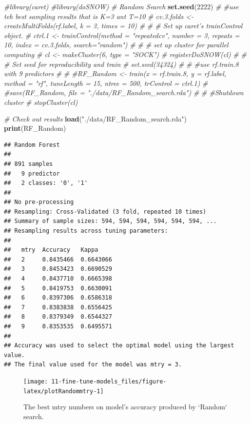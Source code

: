 \documentclass[
]{book}
\newenvironment{Shaded}{\begin{snugshade}}{\end{snugshade}}
\newcommand{\CommentTok}[1]{\textcolor[rgb]{0.56,0.35,0.01}{\textit{#1}}}
\newcommand{\DecValTok}[1]{\textcolor[rgb]{0.00,0.00,0.81}{#1}}
\newcommand{\KeywordTok}[1]{\textcolor[rgb]{0.13,0.29,0.53}{\textbf{#1}}}
\newcommand{\NormalTok}[1]{#1}
\newcommand{\StringTok}[1]{\textcolor[rgb]{0.31,0.60,0.02}{#1}}
\begin{document}
\begin{Shaded}
\begin{Highlighting}[]
\CommentTok{#library(caret)}
\CommentTok{#library(doSNOW)}
\CommentTok{# Random Search}
\KeywordTok{set.seed}\NormalTok{(}\DecValTok{2222}\NormalTok{)}
\CommentTok{# #use teh best sampling results that is K=3 ant T=10}
\CommentTok{# cv.3.folds <- createMultiFolds(rf.label, k = 3, times = 10)}
\CommentTok{# }
\CommentTok{# # Set up caret's trainControl object.}
\CommentTok{# ctrl.1 <- trainControl(method = "repeatedcv", number = 3, repeats = 10, index = cv.3.folds, search="random")}
\CommentTok{# }
\CommentTok{# # set up cluster for parallel computing}
\CommentTok{# cl <- makeCluster(6, type = "SOCK")}
\CommentTok{# registerDoSNOW(cl)}
\CommentTok{# }
\CommentTok{# # Set seed for reproducibility and train}
\CommentTok{# set.seed(34324)}
\CommentTok{# }
\CommentTok{# #use rf.train.8 with 9 predictors }
\CommentTok{# }
\CommentTok{# #RF_Random <- train(x = rf.train.8, y = rf.label, method = "rf", tuneLength = 15, ntree = 500, trControl = ctrl.1)}
\CommentTok{# #save(RF_Random, file = "./data/RF_Random_search.rda")}
\CommentTok{# }
\CommentTok{# #Shutdown cluster}
\CommentTok{# stopCluster(cl)}

\CommentTok{# Check out results}
\KeywordTok{load}\NormalTok{(}\StringTok{"./data/RF_Random_search.rda"}\NormalTok{)}
\KeywordTok{print}\NormalTok{(RF_Random)}
\end{Highlighting}
\end{Shaded}

\begin{verbatim}
## Random Forest 
## 
## 891 samples
##   9 predictor
##   2 classes: '0', '1' 
## 
## No pre-processing
## Resampling: Cross-Validated (3 fold, repeated 10 times) 
## Summary of sample sizes: 594, 594, 594, 594, 594, 594, ... 
## Resampling results across tuning parameters:
## 
##   mtry  Accuracy   Kappa    
##   2     0.8435466  0.6643066
##   3     0.8453423  0.6690529
##   4     0.8437710  0.6665398
##   5     0.8419753  0.6630091
##   6     0.8397306  0.6586318
##   7     0.8383838  0.6556425
##   8     0.8379349  0.6544327
##   9     0.8353535  0.6495571
## 
## Accuracy was used to select the optimal model using the largest value.
## The final value used for the model was mtry = 3.
\end{verbatim}

\begin{figure}

{\centering \texttt{[image: 11-fine-tune-models\_files/figure-latex/plotRandommtry-1]} 

}

\caption{The best mtry numbers on model's accuracy produced by `Random` search.}\label{fig:plotRandommtry}
\end{figure}
\end{document}
